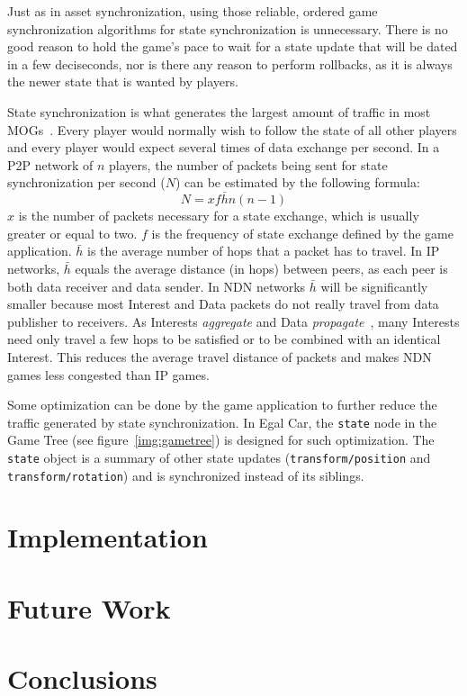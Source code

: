 \documentclass{article}
\begin{document}
Just as in asset synchronization, using those reliable, ordered game synchronization algorithms for state synchronization is unnecessary. There is no good reason to hold the game's pace to wait for a state update that will be dated in a few deciseconds, nor is there any reason to perform rollbacks, as it is always the newer state that is wanted by players.

State synchronization is what generates the largest amount of traffic in most MOGs~\cite{Upen}. Every player would normally wish to follow the state of all other players and every player would expect several times of data exchange per second. In a P2P network of $n$ players, the number of packets being sent for state synchronization per second ($N$) can be estimated by the following formula:
\begin{equation}
N = xf\bar{h}n(n-1)
\end{equation}
$x$ is the number of packets necessary for a state exchange, which is usually greater or equal to two. $f$ is the frequency of state exchange defined by the game application. $\bar{h}$ is the average number of hops that a packet has to travel. In IP networks, $\bar{h}$ equals the average distance (in hops) between peers, as each peer is both data receiver and data sender. In NDN networks $\bar{h}$ will be significantly smaller because most Interest and Data packets do not really travel from data publisher to receivers. As Interests \emph{aggregate} and Data \emph{propagate}~\cite{Jndn}, many Interests need only travel a few hops to be satisfied or to be combined with an identical Interest. This reduces the average travel distance of packets and makes NDN games less congested than IP games.

Some optimization can be done by the game application to further reduce the traffic generated by state synchronization. In Egal Car, the \texttt{state} node in the Game Tree (see figure~\ref{img:gametree}) is designed for such optimization. The \texttt{state} object is a summary of other state updates (\texttt{transform/position} and \texttt{transform/rotation}) and is synchronized instead of its siblings.


\section{Implementation}
\label{implementation}


\section{Future Work}
\label{futurework}


\section{Conclusions}
\label{conclusions}




\end{document}
